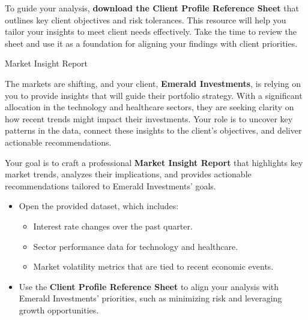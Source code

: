 \documentclass[11pt]{article}
\begin{document}
To guide your analysis, \textbf{download the Client Profile Reference Sheet}
that outlines key client objectives and risk tolerances. This resource will
help you tailor your insights to meet client needs effectively. Take the time
to review the sheet and use it as a foundation for aligning your findings with
client priorities.\par\medskip


\newpage
{\fontsize{26}{30}\selectfont Market Insight Report}\par\bigskip

The markets are shifting, and your client, \textbf{Emerald Investments}, is
relying on you to provide insights that will guide their portfolio strategy.
With a significant allocation in the technology and healthcare sectors, they
are seeking clarity on how recent trends might impact their investments. Your
role is to uncover key patterns in the data, connect these insights to the
client's objectives, and deliver actionable recommendations.



Your goal is to craft a professional \textbf{Market Insight Report} that
highlights key market trends, analyzes their implications, and provides
actionable recommendations tailored to Emerald Investments' goals.


\begin{itemize}[leftmargin=1.5em, itemsep=2pt]
  \item Open the provided dataset, which includes:
  \begin{itemize}[itemsep=1pt]
    \item Interest rate changes over the past quarter.
    \item Sector performance data for technology and healthcare.
    \item Market volatility metrics that are tied to recent economic events.
  \end{itemize}
  \item Use the \textbf{Client Profile Reference Sheet} to align your analysis
  with Emerald Investments' priorities, such as minimizing risk and leveraging
  growth opportunities.
\end{itemize}
\end{document}
